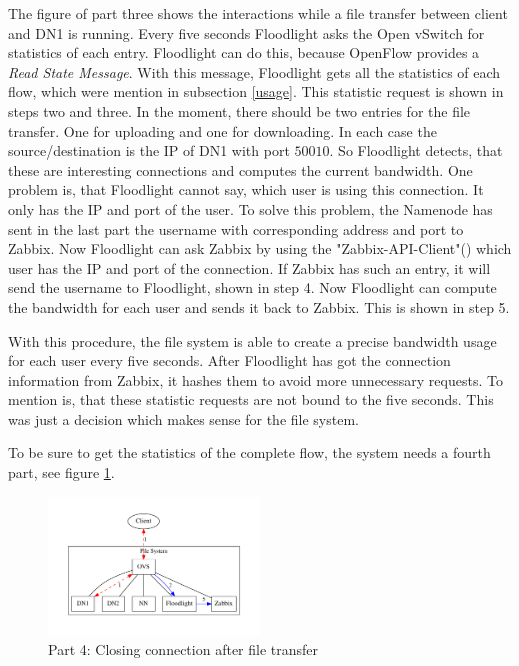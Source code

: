 The figure of part three shows the interactions while a file transfer between client and DN1 is running. Every five seconds Floodlight asks the Open vSwitch for statistics of each entry. Floodlight can do this, because OpenFlow provides a \textit{Read State Message}\cite[p. 30]{ofspec}. With this message, Floodlight gets all the statistics of each flow, which were mention in subsection \ref{usage}. This statistic request is shown in steps two and three. In the moment, there should be two entries for the file transfer. One for uploading and one for downloading. In each case the source/destination is the IP of DN1 with port $50010$. So Floodlight detects, that these are interesting connections and computes the current bandwidth. One problem is, that Floodlight cannot say, which user is using this connection. It only has the IP and port of the user. To solve this problem, the Namenode has sent in the last part the username with corresponding address and port to Zabbix. Now Floodlight can ask Zabbix by using the "Zabbix-API-Client"() which user has the IP and port of the connection. If Zabbix has such an entry, it will send the username to Floodlight, shown in step 4. Now Floodlight can compute the bandwidth for each user and sends it back to Zabbix. This is shown in step 5.

With this procedure, the file system is able to create a precise bandwidth usage for each user every five seconds. After Floodlight has got the connection information from Zabbix, it hashes them to avoid more unnecessary requests. To mention is, that these statistic requests are not bound to the five seconds. This was just a decision which makes sense for the file system.

To be sure to get the statistics of the complete flow, the system needs a fourth part, see figure \ref{cc}.  

\begin{figure}[ht]
\centering
\includegraphics[width=0.5\textwidth]{img/closeConnection} 
\caption{Part 4: Closing connection after file transfer}
\label{cc}
\end{figure}

